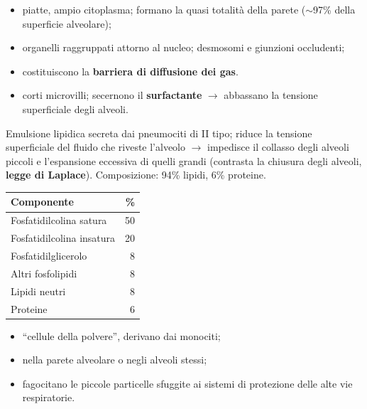 \begin{itemize}
  \item piatte, ampio citoplasma; formano la quasi totalità della parete ($\sim$97\% della superficie
    alveolare);
  \item organelli raggruppati attorno al nucleo; desmosomi e giunzioni occludenti;
  \item costituiscono la \textbf{barriera di diffusione dei gas}.
\end{itemize}

\begin{itemize}
  \item corti microvilli; secernono il \textbf{surfactante} $\rightarrow$ abbassano la tensione
    superficiale degli alveoli.
\end{itemize}

Emulsione lipidica secreta dai pneumociti di II tipo; riduce la tensione superficiale del fluido che
riveste l'alveolo $\rightarrow$ impedisce il collasso degli alveoli piccoli e l'espansione eccessiva
di quelli grandi (contrasta la chiusura degli alveoli, \textbf{legge di Laplace}). Composizione: 94\%
lipidi, 6\% proteine.
\begin{table}[htbp]
  \centering \small \renewcommand{\arraystretch}{1.15}
  \begin{tabular}{|l|r|}
    \hline
    \textbf{Componente} & \textbf{\%} \\
    \hline
    Fosfatidilcolina satura   & 50 \\
    Fosfatidilcolina insatura & 20 \\
    Fosfatidilglicerolo       & 8 \\
    Altri fosfolipidi         & 8 \\
    Lipidi neutri             & 8 \\
    Proteine                  & 6 \\
    \hline
  \end{tabular}
\end{table}

\begin{itemize}
  \item ``cellule della polvere'', derivano dai monociti;
  \item nella parete alveolare o negli alveoli stessi;
  \item fagocitano le piccole particelle sfuggite ai sistemi di protezione delle alte vie respiratorie.
\end{itemize}

